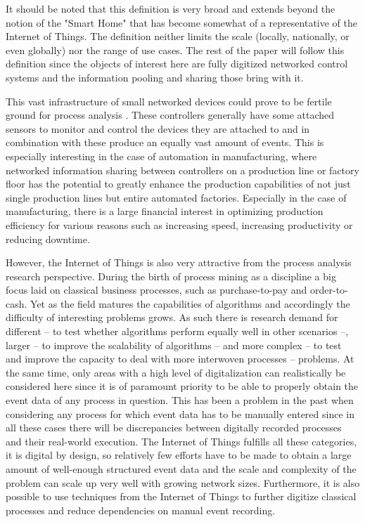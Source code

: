 \documentclass[runningheads]{template/llncs}
\begin{document}
It should be noted that this definition is very broad and extends beyond the notion of the "Smart Home" that has become somewhat of a representative of the Internet of Things.
The definition neither limits the scale (locally, nationally, or even globally) nor the range of use cases.
The rest of the paper will follow this definition since the objects of interest here are fully digitized networked control systems and the information pooling and sharing those bring with it.

This vast infrastructure of small networked devices could prove to be fertile ground for process analysis \cite{JKM*20}.
These controllers generally have some attached sensors to monitor and control the devices they are attached to and in combination with these produce an equally vast amount of events.
This is especially interesting in the case of automation in manufacturing, where networked information sharing between controllers on a production line or factory floor has the potential to greatly enhance the production capabilities of not just single production lines but entire automated factories.
Especially in the case of manufacturing, there is a large financial interest in optimizing production efficiency for various reasons such as increasing speed, increasing productivity or reducing downtime.

However, the Internet of Things is also very attractive from the process analysis research perspective.
During the birth of process mining as a discipline a big focus laid on classical business processes, such as purchase-to-pay and order-to-cash.
Yet as the field matures the capabilities of algorithms and accordingly the difficulty of interesting problems grows.
As such there is research demand \cite{JKM*20} for different -- to test whether algorithms perform equally well in other scenarios --, larger -- to improve the scalability of algorithms -- and more complex -- to test and improve the capacity to deal with more interwoven processes -- problems.
At the same time, only areas with a high level of digitalization can realistically be considered here since it is of paramount priority to be able to properly obtain the event data of any process in question.
This has been a problem in the past when considering any process for which event data has to be manually entered since in all these cases there will be discrepancies between digitally recorded processes and their real-world execution.
The Internet of Things fulfills all these categories, it is digital by design, so relatively few efforts have to be made to obtain a large amount of well-enough structured event data and the scale and complexity of the problem can scale up very well with growing network sizes. 
Furthermore, it is also possible to use techniques from the Internet of Things to further digitize classical processes and reduce dependencies on manual event recording.
\end{document}
